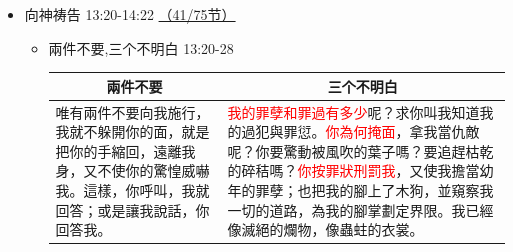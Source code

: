\begin{itemize}
\begin{itemize}
\item 約伯持定自己有義願以死相争 13:13-19\\
13 「你們不要作聲，任憑我吧！讓我說話，無論如何我都承當。 14 我何必把我的肉掛在牙上，將我的命放在手中？ 15 他必殺我，我雖無指望，然而我在他面前還要辯明我所行的。 16 這要成為我的拯救，因為不虔誠的人，不得到他面前。 17 你們要細聽我的言語，使我所辯論的入你們的耳中。 18 我已陳明我的案，知道自己有義。 19 有誰與我爭論，我就情願緘默不言，氣絕而亡。
\end{itemize}
\item 向神祷告 13:20-14:22 \underline{（41/75节）}
\begin{itemize}
\itemsep-.45em 
\item 兩件不要,三个不明白 13:20-28

\begin{table}[H]
\centering 
\begin{tabular}{p{}|p{}}    \toprule
\multicolumn{1}{c|}{兩件不要}&\multicolumn{1}{c}{三个不明白}\\\hline
唯有兩件不要向我施行，我就不躲開你的面，就是把你的手縮回，遠離我身，又不使你的驚惶威嚇我。這樣，你呼叫，我就回答；或是讓我說話，你回答我。
&\textcolor{red}{我的罪孽和罪過有多少}呢？求你叫我知道我的過犯與罪愆。\textcolor{red}{你為何掩面}，拿我當仇敵呢？你要驚動被風吹的葉子嗎？要追趕枯乾的碎秸嗎？\textcolor{red}{你按罪狀刑罰我}，又使我擔當幼年的罪孽；也把我的腳上了木狗，並窺察我一切的道路，為我的腳掌劃定界限。我已經像滅絕的爛物，像蟲蛀的衣裳。\\ \bottomrule
\end{tabular} 
\end{table}


\end{itemize}
\end{itemize}

